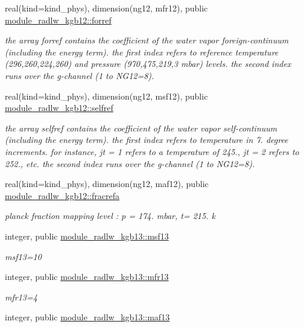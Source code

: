 \begin{Indent}
\begin{DoxyCompactItemize}
real(kind=kind\+\_\+phys), dimension(ng12, mfr12), public \hyperlink{group__module__radlw__kgbnn_ga97dac0d0e010441171e09e317e5aeee8}{module\+\_\+radlw\+\_\+kgb12\+::forref}
\begin{DoxyCompactList}\small\item\em the array forref contains the coefficient of the water vapor foreign-\/continuum (including the energy term). the first index refers to reference temperature (296,260,224,260) and pressure (970,475,219,3 mbar) levels. the second index runs over the g-\/channel (1 to N\+G12=8). \end{DoxyCompactList}\item 
real(kind=kind\+\_\+phys), dimension(ng12, msf12), public \hyperlink{group__module__radlw__kgbnn_ga8aaf83ec7a08a244fd1e5396c9fd9b1d}{module\+\_\+radlw\+\_\+kgb12\+::selfref}
\begin{DoxyCompactList}\small\item\em the array selfref contains the coefficient of the water vapor self-\/continuum (including the energy term). the first index refers to temperature in 7. degree increments. for instance, jt = 1 refers to a temperature of 245., jt = 2 refers to 252., etc. the second index runs over the g-\/channel (1 to N\+G12=8). \end{DoxyCompactList}\item 
real(kind=kind\+\_\+phys), dimension(ng12, maf12), public \hyperlink{group__module__radlw__kgbnn_ga58ff4f54c11eb12f7ab5157823981b16}{module\+\_\+radlw\+\_\+kgb12\+::fracrefa}
\begin{DoxyCompactList}\small\item\em planck fraction mapping level \+: p = 174. mbar, t= 215. k \end{DoxyCompactList}\item 
integer, public \hyperlink{group__module__radlw__kgbnn_ga7f88590d2a9fc392b04e89fd3d4bf2bf}{module\+\_\+radlw\+\_\+kgb13\+::msf13}
\begin{DoxyCompactList}\small\item\em msf13=10 \end{DoxyCompactList}\item 
integer, public \hyperlink{group__module__radlw__kgbnn_ga158782c955af9f50aaefea2d49af97ce}{module\+\_\+radlw\+\_\+kgb13\+::mfr13}
\begin{DoxyCompactList}\small\item\em mfr13=4 \end{DoxyCompactList}\item 
integer, public \hyperlink{group__module__radlw__kgbnn_ga1ddc025df872b12194b8c6344cc0204e}{module\+\_\+radlw\+\_\+kgb13\+::maf13}

\end{DoxyCompactItemize}
\end{Indent}
